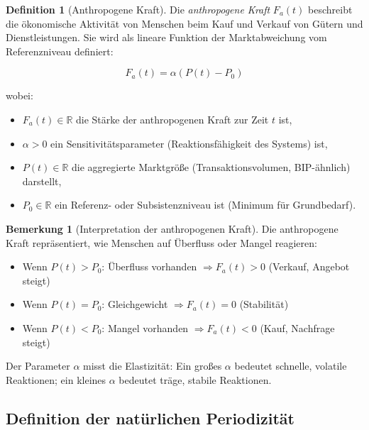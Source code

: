\documentclass[a4paper, 12pt, twoside, openright]{report}
\theoremstyle{definition}
\newtheorem{definition}[theorem]{Definition}
\theoremstyle{definition}
\newtheorem{bemerkung}{Bemerkung}[chapter]
\begin{document}
\begin{definition}[Anthropogene Kraft]\label{def:anthropogene}
    Die \emph{anthropogene Kraft} $F_a(t)$ beschreibt die ökonomische Aktivität von Menschen beim Kauf und Verkauf von Gütern und Dienstleistungen. Sie wird als lineare Funktion der Marktabweichung vom Referenzniveau definiert:
    
    \begin{equation}
        \boxed{F_a(t) = \alpha(P(t) - P_0)}
        \label{eq:anthropogene}
    \end{equation}
    
    wobei:
    \begin{itemize}
        \item $F_a(t) \in \mathbb{R}$ die Stärke der anthropogenen Kraft zur Zeit $t$ ist,
        \item $\alpha > 0$ ein Sensitivitätsparameter (Reaktionsfähigkeit des Systems) ist,
        \item $P(t) \in \mathbb{R}$ die aggregierte Marktgröße (Transaktionsvolumen, BIP-ähnlich) darstellt,
        \item $P_0 \in \mathbb{R}$ ein Referenz- oder Subsistenzniveau ist (Minimum für Grundbedarf).
    \end{itemize}
\end{definition}

\begin{bemerkung}[Interpretation der anthropogenen Kraft]
    
    Die anthropogene Kraft repräsentiert, wie Menschen auf Überfluss oder Mangel reagieren:
    
    \begin{itemize}
        \item Wenn $P(t) > P_0$: Überfluss vorhanden $\Rightarrow F_a(t) > 0$ (Verkauf, Angebot steigt)
        \item Wenn $P(t) = P_0$: Gleichgewicht $\Rightarrow F_a(t) = 0$ (Stabilität)
        \item Wenn $P(t) < P_0$: Mangel vorhanden $\Rightarrow F_a(t) < 0$ (Kauf, Nachfrage steigt)
    \end{itemize}
    
    Der Parameter $\alpha$ misst die Elastizität: Ein großes $\alpha$ bedeutet schnelle, volatile Reaktionen; ein kleines $\alpha$ bedeutet träge, stabile Reaktionen.
\end{bemerkung}

\subsection{Definition der natürlichen Periodizität}
\end{document}
